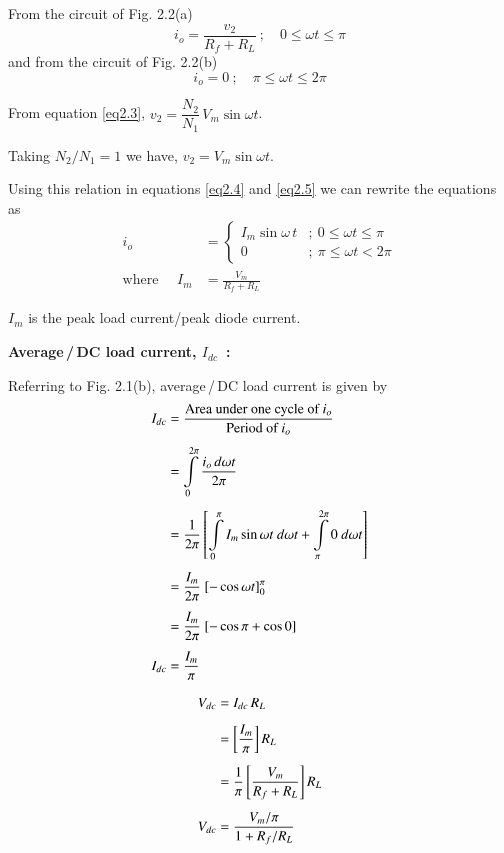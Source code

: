 From the circuit of Fig. 2.2(a)
\begin{equation}
i_o = \frac{v_2}{R_f + R_L}~;\quad 0\leq \omega t \leq \pi \label{eq2.4}
\end{equation}
and from the circuit of Fig. 2.2(b)
\begin{equation}
i_o = 0~;\quad \pi\leq \omega t\leq 2\pi \label{eq2.5}
\end{equation}

From equation \eqref{eq2.3}, $v_2 = \dfrac{N_2}{N_1}\, V_m \sin \omega t$.

Taking $N_2/ N_1 = 1$  we have, $v_2 = V_m \sin \omega t$.

Using this relation in equations \eqref{eq2.4} and \eqref{eq2.5} we can rewrite the
equations as 
\begin{align}
i_o & = \begin{cases}
I_m \sin \omega\,t & ; ~ 0 \leq \omega t \leq \pi\\
0  & ; ~ \pi \leq \omega t < 2 \pi
  \end{cases} \label{eq2.6}\\
\text{where } \quad I_m & = \frac{V_m}{R_f + R_L}\label{eq2.7}
\end{align}

$I_m$ is the peak load current/peak diode current.

\smallskip
{\bf Average\,/\,DC load current, \boldmath$I_{dc}$~:}

Referring to Fig. 2.1(b), average\,/\,DC load current is given by
\begin{align}
I_{dc} & = \frac{\text{Area under one cycle of $i_o$}}{\text{Period of
  $i_o$}}\notag\\[4pt]
& = \int\limits^{2\pi}_0 \frac{i_o\,d \omega t}{2 \pi}\notag\\[4pt]
& = \frac{1}{2\pi} \left[\int\limits^\pi_0 I_m \sin \omega t ~ d \omega
  t + \int\limits^{2\pi}_\pi 0 ~ d \omega t\right]\notag\\[4pt]
& = \frac{I_m}{2\pi} \ [-\cos \omega t]^{\pi}_0\notag\\[4pt]
& = \frac{I_m}{2\pi} \ [-\cos \pi + \cos 0]\notag\\[4pt]
I_{dc} & = \frac{I_m}{\pi} \label{eq2.8}
\end{align}

\eject

\begin{align}
V_{dc} & = I_{dc}\, R_L \notag\\[5pt]
& = \left[\frac{I_m}{\pi} \right] R_L \notag\\[5pt]
& = \frac{1}{\pi} \left[\frac{V_m}{R_f + R_L} \right] R_L \notag\\[5pt]
V_{dc} & = \frac{V_m /\pi}{1+ R_f /R_L}\label{eq2.9}
\end{align} 

